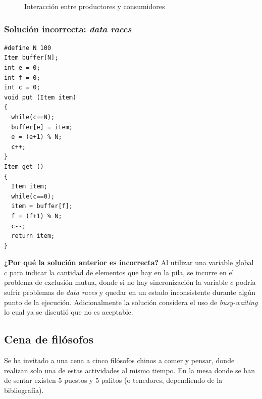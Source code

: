 \begin{figure}[htbp]
	\centering
	\caption{Interacción entre productores y consumidores}
	\label{fig:interaccion_productores_consumidores}
\end{figure}

\subsubsection{Solución incorrecta: \emph{data races}}

\begin{lstlisting}
#define N 100
Item buffer[N];
int e = 0;
int f = 0;
int c = 0;
void put (Item item)
{
  while(c==N);
  buffer[e] = item;
  e = (e+1) % N;
  c++;
}
Item get ()
{
  Item item;
  while(c==0);
  item = buffer[f];
  f = (f+1) % N;
  c--;
  return item;
}
\end{lstlisting}

\textbf{¿Por qué la solución anterior es incorrecta?} Al utilizar una variable
global $c$ para indicar la cantidad de elementos que hay en la pila, se incurre
en el problema de exclusión mutua, donde si no hay sincronización la variable
$c$ podría sufrir problemas de \emph{data races} y quedar en un estado
inconsistente durante algún punto de la ejecución. Adicionalmente la solución
considera el uso de \emph{busy-waiting} lo cual ya se discutió que no es
aceptable.

\subsection{Cena de filósofos}
Se ha invitado a una cena a cinco filósofos chinos a comer y pensar, donde
realizan solo una de estas actividades al mismo tiempo. En la mesa donde se han
de sentar existen 5 puestos y 5 palitos (o tenedores, dependiendo de la
bibliografía).

